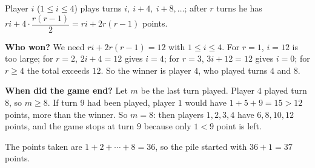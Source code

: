 Player $i$ ($1\le i\le4$) plays turns $i,\ i+4,\ i+8,\dots$; after $r$ turns he has $ri+4\cdot\dfrac{r(r-1)}{2}=ri+2r(r-1)$ points.

\textbf{Who won?} We need $ri+2r(r-1)=12$ with $1\le i\le4$. For $r=1$, $i=12$ is too large; for $r=2$, $2i+4=12$ gives $i=4$; for $r=3$, $3i+12=12$ gives $i=0$; for $r\ge4$ the total exceeds $12$. So the winner is player $4$, who played turns $4$ and $8$.

\textbf{When did the game end?} Let $m$ be the last turn played. Player $4$ played turn $8$, so $m\ge8$. If turn $9$ had been played, player $1$ would have $1+5+9=15>12$ points, more than the winner. So $m=8$: then players $1,2,3,4$ have $6,8,10,12$ points, and the game stops at turn $9$ because only $1<9$ point is left.

The points taken are $1+2+\cdots+8=36$, so the pile started with $36+1=\boxed{37}$ points.
